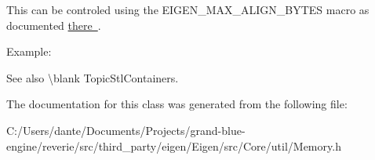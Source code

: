 This can be controled using the {\ttfamily E\+I\+G\+E\+N\+\_\+\+M\+A\+X\+\_\+\+A\+L\+I\+G\+N\+\_\+\+B\+Y\+T\+ES} macro as documented \mbox{\hyperlink{}{there }}.

Example\+: 
\begin{DoxyCode}{0}
\DoxyCodeLine{\textcolor{comment}{// Matrix4f requires 16 bytes alignment:}}
\DoxyCodeLine{\textcolor{comment}{// Vector3f does not require 16 bytes alignment, no need to use Eigen's allocator:}}
\end{DoxyCode}


\begin{DoxySeeAlso}{See also}
\textbackslash{}blank Topic\+Stl\+Containers. 
\end{DoxySeeAlso}


The documentation for this class was generated from the following file\+:\begin{DoxyCompactItemize}
\item 
C\+:/\+Users/dante/\+Documents/\+Projects/grand-\/blue-\/engine/reverie/src/third\+\_\+party/eigen/\+Eigen/src/\+Core/util/Memory.\+h\end{DoxyCompactItemize}
